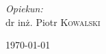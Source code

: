 \begin{titlepage}
\begin{center}
\begin{minipage}[t]{0.4\textwidth}
\begin{flushleft}
\end{flushleft}
\end{minipage}
\begin{minipage}[t]{0.4\textwidth}
\begin{flushright} \large
\emph{Opiekun:}\\[0.1cm]
dr inż. Piotr \textsc{Kowalski}
\end{flushright}
\end{minipage}

\vfill
{\large \today }
\end{center}

\end{titlepage}